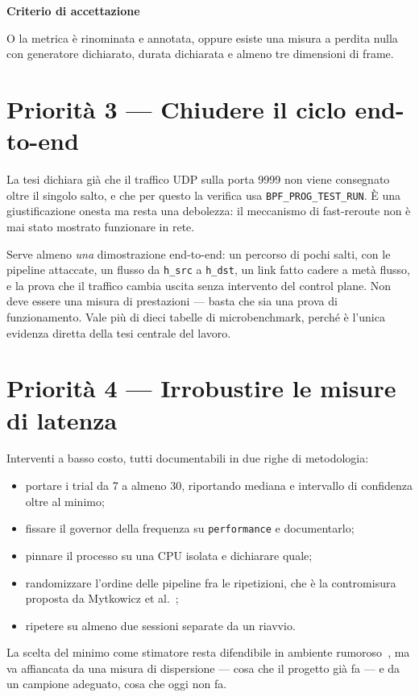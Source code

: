 \documentclass[11pt,a4paper,oneside]{report}
\newcommand{\verdetto}[2]{%
  \par\vspace{4pt}%
  \noindent\colorbox{boxbg}{%
    \begin{minipage}{\dimexpr\linewidth-2\fboxsep}%
      \vspace{3pt}\textbf{\color{accent}#1}\par\vspace{2pt}#2\vspace{3pt}%
    \end{minipage}}%
  \par\vspace{6pt}}
\begin{document}
\verdetto{Criterio di accettazione}{O la metrica è rinominata e
annotata, oppure esiste una misura a perdita nulla con generatore
dichiarato, durata dichiarata e almeno tre dimensioni di frame.}

\section{Priorità 3 --- Chiudere il ciclo end-to-end}

La tesi dichiara già che il traffico UDP sulla porta 9999 non viene
consegnato oltre il singolo salto, e che per questo la verifica usa
\texttt{BPF\_PROG\_TEST\_RUN}. È una giustificazione onesta ma resta
una debolezza: il meccanismo di fast-reroute non è mai stato mostrato
funzionare in rete.

Serve almeno \emph{una} dimostrazione end-to-end: un percorso di pochi
salti, con le pipeline attaccate, un flusso da \texttt{h\_src} a
\texttt{h\_dst}, un link fatto cadere a metà flusso, e la prova che il
traffico cambia uscita senza intervento del control plane. Non deve
essere una misura di prestazioni --- basta che sia una prova di
funzionamento. Vale più di dieci tabelle di microbenchmark, perché è
l'unica evidenza diretta della tesi centrale del lavoro.

\section{Priorità 4 --- Irrobustire le misure di latenza}

Interventi a basso costo, tutti documentabili in due righe di
metodologia:

\begin{itemize}
  \item portare i trial da 7 a almeno 30, riportando mediana e
  intervallo di confidenza oltre al minimo;
  \item fissare il governor della frequenza su \texttt{performance} e
  documentarlo;
  \item pinnare il processo su una CPU isolata e dichiarare quale;
  \item randomizzare l'ordine delle pipeline fra le ripetizioni, che è
  la contromisura proposta da Mytkowicz et al.~\cite{mytkowicz09};
  \item ripetere su almeno due sessioni separate da un riavvio.
\end{itemize}

La scelta del minimo come stimatore resta difendibile in ambiente
rumoroso~\cite{chen16}, ma va affiancata da una misura di dispersione
--- cosa che il progetto già fa --- e da un campione adeguato, cosa che
oggi non fa.
\end{document}
